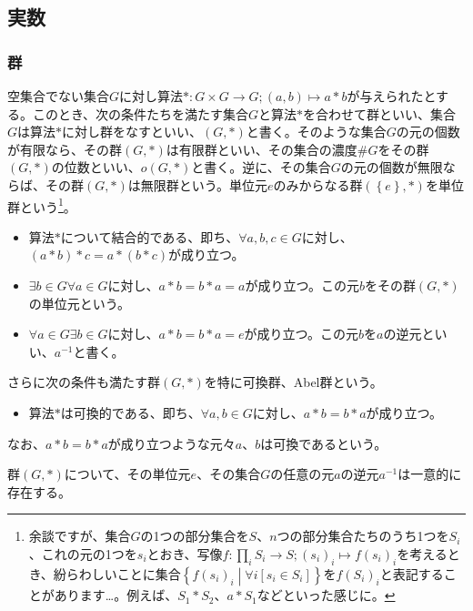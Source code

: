 \documentclass[dvipdfmx]{jsarticle}
\begin{document}
\subsection{実数}%
\subsubsection{群}%
\begin{axs}[群の公理]
空集合でない集合$G$に対し算法$*:G \times G \rightarrow G;(a,b) \mapsto a*b$が与えられたとする。このとき、次の条件たちを満たす集合$G$と算法$*$を合わせて群といい、集合$G$は算法$*$に対し群をなすといい、$(G,*)$と書く。そのような集合$G$の元の個数が有限なら、その群$(G,*)$は有限群といい、その集合の濃度$\#G$をその群$(G,*)$の位数といい、$o(G,*)$と書く。逆に、その集合$G$の元の個数が無限ならば、その群$(G,*)$は無限群という。単位元$e$のみからなる群$\left( \left\{ e \right\},* \right)$を単位群という\footnote{余談ですが、集合$G$の1つの部分集合を$S$、$n$つの部分集合たちのうち1つを$S_{i}$、これの元の1つを$s_{i}$とおき、写像$f:\prod_{i} S_{i} \rightarrow S;\left( s_{i} \right)_{i} \mapsto f\left( s_{i} \right)_{i}$を考えるとき、紛らわしいことに集合$\left\{ f\left( s_{i} \right)_{i} \middle| \forall i\left\lbrack s_{i} \in S_{i} \right\rbrack \right\}$を$f\left( S_{i} \right)_{i}$と表記することがあります…。例えば、$S_{1}*S_{2}$、$a*S_{1}$などといった感じに。}。
\begin{itemize}
\item
  算法$*$について結合的である、即ち、$\forall a,b,c \in G$に対し、$(a*b)*c = a*(b*c)$が成り立つ。
\item
  $\exists b \in G\forall a \in G$に対し、$a*b = b*a = a$が成り立つ。この元$b$をその群$(G,*)$の単位元という。
\item
  $\forall a \in G\exists b \in G$に対し、$a*b = b*a = e$が成り立つ。この元$b$を$a$の逆元といい、$a^{- 1}$と書く。
\end{itemize}
さらに次の条件も満たす群$(G,*)$を特に可換群、Abel群という。
\begin{itemize}
\item
  算法$*$は可換的である、即ち、$\forall a,b \in G$に対し、$a*b = b*a$が成り立つ。
\end{itemize}
なお、$a*b = b*a$が成り立つような元々$a$、$b$は可換であるという。
\end{axs}
\begin{thm}\label{4.1.1.1}
群$(G,*)$について、その単位元$e$、その集合$G$の任意の元$a$の逆元$a^{- 1}$は一意的に存在する。
\end{thm}\par
\end{document}
